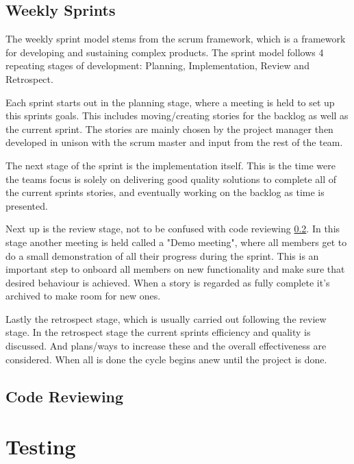\subsection{Weekly Sprints} \label{sub:weekly-sprints}
    The weekly sprint model stems from the scrum framework, which is a framework for developing and sustaining complex products. The sprint model follows 4 repeating stages of development: Planning, Implementation, Review and Retrospect.

    Each sprint starts out in the planning stage, where a meeting is held to set up this sprints goals. This includes moving/creating stories for the backlog as well as the current sprint. The stories are mainly chosen by the project manager then developed in unison with the scrum master and input from the rest of the team.

    The next stage of the sprint is the implementation itself. This is the time were the teams focus is solely on delivering good quality solutions to complete all of the current sprints stories, and eventually working on the backlog as time is presented.

    Next up is the review stage, not to be confused with code reviewing \ref{sub:code-reviewing}. In this stage another meeting is held called a "Demo meeting", where all members get to do a small demonstration of all their progress during the sprint. This is an important step to onboard all members on new functionality and make sure that desired behaviour is achieved. When a story is regarded as fully complete it's archived to make room for new ones.

    Lastly the retrospect stage, which is usually carried out following the review stage. In the retrospect stage the current sprints efficiency and quality is discussed. And plans/ways to increase these and the overall effectiveness are considered. When all is done the cycle begins anew until the project is done.

\subsection{Code Reviewing} \label{sub:code-reviewing}

\section{Testing}